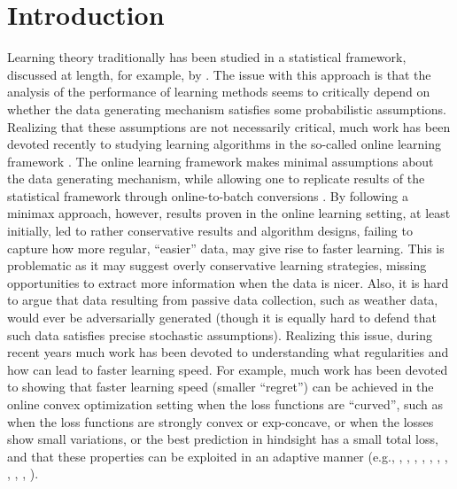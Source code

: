 \documentclass[english]{article}
\begin{document}
\section{Introduction}
Learning theory traditionally has been studied in a statistical framework, discussed at length, for example, by \citet{SSS14:book}.
The issue with this approach is that the analysis of the performance of learning methods seems to critically depend
on whether the data generating mechanism satisfies some probabilistic assumptions. 
Realizing that these assumptions are not necessarily critical, much work has been devoted recently to 
studying learning algorithms in the so-called online learning framework \citep{CBLu06:book}. 
The online learning framework makes minimal assumptions about the data generating mechanism,
while allowing one to replicate results of the statistical framework through online-to-batch conversions
\citep{CBCoG04:OnlineToBatch}.
By following a minimax approach, however, results proven in the online learning setting, at least initially, led to rather
conservative results and algorithm designs, failing to capture how more regular, ``easier'' data, may give rise to
faster learning. This is problematic as it may suggest overly conservative learning strategies, missing
opportunities to extract more information when the data is nicer. Also, it is hard to argue that data resulting from
passive data collection, such as weather data, would ever be adversarially generated (though it is equally hard
to defend that such data satisfies precise stochastic assumptions).
Realizing this issue, during recent years much work has been devoted to understanding what regularities and how can lead to 
faster learning speed.
For example, much work has been devoted to showing that faster learning speed (smaller ``regret'') can be achieved
in the online convex optimization setting when the loss functions are ``curved'', such 
as when the loss functions are strongly convex or exp-concave, 
or when the losses show small variations, or the best prediction in hindsight has a small total loss, and that these properties can be exploited in an adaptive manner  (e.g.,
\citealt{MF92}, \citealt{FrSc97},
\citealt{gaivoronski2000stochastic},
\citealt{CBLu06:book},
\citealt{hazan2007logarithmic},
\citealt{bartlett2007adaptive},
\citealt{kakade2009mind},
\citealt{orabona2012beyond},
\citealt{RakhlinS13},
\citealt{vanerven2015fast},
\citealt{foster2015adaptive}).
\end{document}
